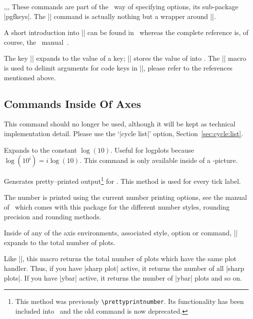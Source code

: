\begin{commandlist}{\pgfkeys,\pgfeov,\pgfkeysvalueof,\pgfkeysgetvalue}
	These commands are part of the \Tikz\ way of specifying options, its sub-package |pgfkeys|. The |\pgfplotsset| command is actually nothing but a wrapper around |\pgfkeys|.

	A short introduction into |\pgfkeys| can be found in~\cite{keyvalintro} whereas the complete reference is, of course, the \Tikz\ manual~\cite{tikz}.

	The key |\pgfkeysvalueof| expands to the value of a key; |\pgfkeysgetvalue| stores the value of  into . The |\pgfeov| macro is used to delimit arguments for code keys in |\pgfkeys|, please refer to the references mentioned above.
\end{commandlist}

\subsection[Commands Inside Of PGFPlots Axes]{Commands Inside Of {\normalfont\PGFPlots} Axes}
\begin{command}{\autoplotspeclist}
This command should no longer be used, although it will be kept as technical implementation detail. Please use the `|cycle list|' option, Section~\ref{sec:cycle:list}.
\end{command}

\begin{command}{\logten}
Expands to the constant $\log(10)$. Useful for logplots because $\log(10^i) = i\log(10)$. This command is only available inside of a \Tikz-picture.
\end{command}

\begin{command}{\pgfmathprintnumber{}}
Generates pretty--printed output\footnote{This method was previously \texttt{\textbackslash prettyprintnumber}. Its functionality has been included into \PGF\ and the old command is now deprecated.} for . This method is used for every tick label.

The number is printed using the current number printing options, see the manual of \PGFPlotstable\ which comes with this package for the different number styles, rounding precision and rounding methods.
\end{command}

\begin{command}{\numplots}
	Inside of any of the axis environments, associated style, option or command, |\numplots| expands to the total number of  plots.
\end{command}
\begin{command}{\numplotsofactualtype}
	Like |\numplots|, this macro returns the total number of plots which have the same plot handler. Thus, if you have |sharp plot| active, it returns the number of all |sharp plots|. If you have |ybar| active, it returns the number of |ybar| plots and so on.
\end{command}

